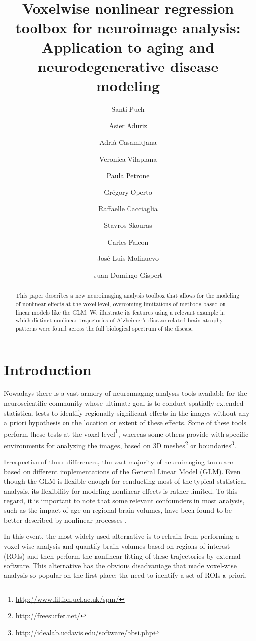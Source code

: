 \documentclass{article}
\title{Voxelwise nonlinear regression toolbox for neuroimage analysis: Application to aging and neurodegenerative disease modeling}
\author[1]{Santi Puch}
\author[1]{Asier Aduriz}
\author[1]{Adrià Casamitjana}
\author[1]{Veronica Vilaplana}
\author[2]{Paula Petrone}
\author[2]{Grégory Operto}
\author[2]{Raffaelle Cacciaglia}
\author[2]{Stavros Skouras}
\author[2]{Carles Falcon}
\author[2]{José Luis Molinuevo}
\author[2]{Juan Domingo Gispert}
\affil[1]{Universitat Politècnica de Catalunya, Barcelona, Spain \\
\texttt{veronica.vilaplana@upc.edu}}
\affil[2]{Barcelona$\beta$eta Brain Research Center, Barcelona, Spain}
\begin{document}

\maketitle

\begin{abstract}
This paper describes a new neuroimaging analysis toolbox that allows for the modeling of nonlinear effects at the voxel level, overcoming limitations of methods based on linear models like the GLM. We illustrate its features using a relevant example in which distinct nonlinear trajectories of Alzheimer's disease related brain atrophy patterns were found across the full biological spectrum of the disease.
\end{abstract}

\section{Introduction}

Nowadays there is a vast armory of neuroimaging analysis tools available for the neuroscientific community whose ultimate goal is to conduct spatially extended statistical tests to identify regionally significant effects in the images without any a priori hypothesis on the location or extent of these effects. Some of these tools perform these tests at the voxel level\footnote{\url{http://www.fil.ion.ucl.ac.uk/spm/}}, whereas some others provide with specific environments for analyzing the images, based on 3D meshes\footnote{\url{http://freesurfer.net/}} or boundaries\footnote{\url{http://idealab.ucdavis.edu/software/bbsi.php}}. 

Irrespective of these differences, the vast majority of neuroimaging tools are based on different implementations of the General Linear Model (GLM). Even though the GLM is flexible enough for conducting most of the typical statistical analysis, its flexibility for modeling nonlinear effects is rather limited. To this regard, it is important to note that some relevant confounders in most analysis, such as the impact of age on regional brain volumes, have been found to be better described by nonlinear processes \cite{nonlinear_subcortical,nonlinear_cortical}.

In this event, the most widely used alternative is to refrain from performing a voxel-wise analysis and quantify brain volumes based on regions of interest (ROIs) and then perform the nonlinear fitting of these trajectories by external software. This alternative has the obvious disadvantage that made voxel-wise analysis so popular on the first place: the need to identify a set of ROIs a priori. 
\end{document}
